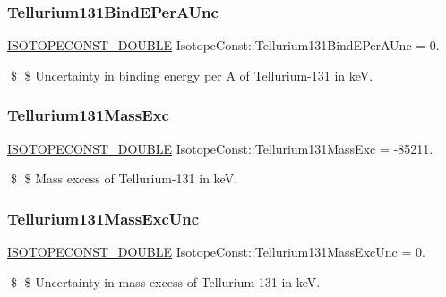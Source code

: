 \subsubsection{\texorpdfstring{Tellurium131\+Bind\+E\+Per\+A\+Unc}{Tellurium131BindEPerAUnc}}
{\footnotesize\ttfamily \mbox{\hyperlink{group___isotope_const-_macros_ga8f45a7272ce02c0b4c65c44636ed719a}{I\+S\+O\+T\+O\+P\+E\+C\+O\+N\+S\+T\+\_\+\+D\+O\+U\+B\+LE}} Isotope\+Const\+::\+Tellurium131\+Bind\+E\+Per\+A\+Unc = 0.}

\$ \$ Uncertainty in binding energy per A of Tellurium-\/131 in keV. \mbox{\label{group___isotope_const-_tellurium-_te131_ga6b2db016fe02687a711ab791b2834828}} 
\subsubsection{\texorpdfstring{Tellurium131\+Mass\+Exc}{Tellurium131MassExc}}
{\footnotesize\ttfamily \mbox{\hyperlink{group___isotope_const-_macros_ga8f45a7272ce02c0b4c65c44636ed719a}{I\+S\+O\+T\+O\+P\+E\+C\+O\+N\+S\+T\+\_\+\+D\+O\+U\+B\+LE}} Isotope\+Const\+::\+Tellurium131\+Mass\+Exc = -\/85211.}

\$ \$ Mass excess of Tellurium-\/131 in keV. \mbox{\label{group___isotope_const-_tellurium-_te131_ga3d14c4668017d93d49bf6c434ab5e370}} 
\subsubsection{\texorpdfstring{Tellurium131\+Mass\+Exc\+Unc}{Tellurium131MassExcUnc}}
{\footnotesize\ttfamily \mbox{\hyperlink{group___isotope_const-_macros_ga8f45a7272ce02c0b4c65c44636ed719a}{I\+S\+O\+T\+O\+P\+E\+C\+O\+N\+S\+T\+\_\+\+D\+O\+U\+B\+LE}} Isotope\+Const\+::\+Tellurium131\+Mass\+Exc\+Unc = 0.}

\$ \$ Uncertainty in mass excess of Tellurium-\/131 in keV. \mbox{\label{group___isotope_const-_tellurium-_te131_gacb9084e286a93676517bf607640292d8}} 
